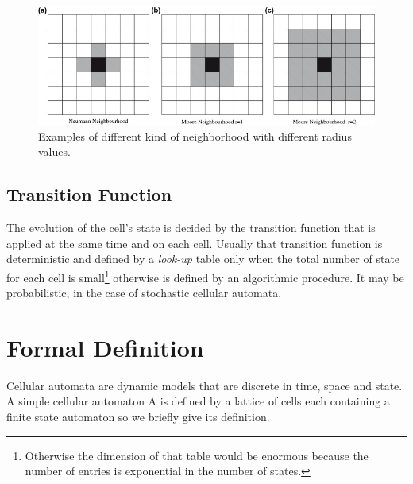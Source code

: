 \begin{figure}
\centering
\caption{Examples of different kind of neighborhood with
different radius values.}\label{mooreNeigh}
\includegraphics[scale=0.9]{./images/CA_FDM/mooreNeigh}
\end{figure}

\subsection{Transition Function}
The evolution of the cell's state is decided by the transition function that
is applied at the same time and on each cell. Usually that transition function
is deterministic and defined by a \textit{look-up} table only when the total
number of state for each cell is small\footnote{Otherwise the dimension of that table would be enormous because the number of entries is exponential in the number of
states.} otherwise is defined by an algorithmic procedure.
It may be probabilistic, in the case of stochastic cellular automata.






\section{Formal Definition}
Cellular automata are dynamic models that are
discrete in time, space and state. A simple cellular
automaton A is defined by a lattice of cells each containing a finite state
automaton so we briefly give its definition.

